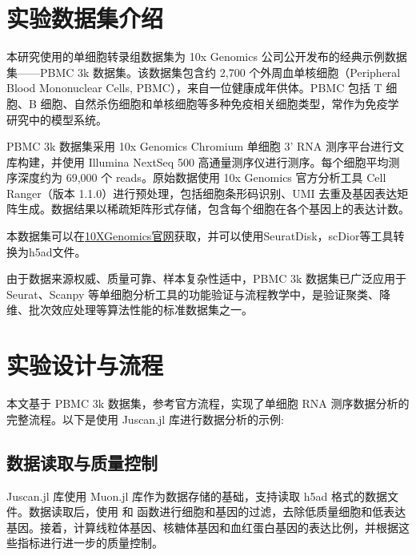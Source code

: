 
\section{实验数据集介绍}

本研究使用的单细胞转录组数据集为 10x Genomics 公司公开发布的经典示例数据集——PBMC 3k 数据集。该数据集包含约 2,700 个外周血单核细胞（Peripheral Blood Mononuclear Cells, PBMC），来自一位健康成年供体。PBMC 包括 T 细胞、B 细胞、自然杀伤细胞和单核细胞等多种免疫相关细胞类型，常作为免疫学研究中的模型系统。

PBMC 3k 数据集采用 10x Genomics Chromium 单细胞 3' RNA 测序平台进行文库构建，并使用 Illumina NextSeq 500 高通量测序仪进行测序。每个细胞平均测序深度约为 69,000 个 reads。原始数据使用 10x Genomics 官方分析工具 Cell Ranger（版本 1.1.0）进行预处理，包括细胞条形码识别、UMI 去重及基因表达矩阵生成。数据结果以稀疏矩阵形式存储，包含每个细胞在各个基因上的表达计数。

本数据集可以在\href{https://cf.10xgenomics.com/samples/cell/pbmc3k/pbmc3k_filtered_gene_bc_matrices.tar.gz}{10XGenomics官网}获取，并可以使用SeuratDisk，scDior等工具转换为h5ad文件。

由于数据来源权威、质量可靠、样本复杂性适中，PBMC 3k 数据集已广泛应用于 Seurat、Scanpy 等单细胞分析工具的功能验证与流程教学中，是验证聚类、降维、批次效应处理等算法性能的标准数据集之一。


\section{实验设计与流程}

本文基于 PBMC 3k 数据集，参考官方流程，实现了单细胞 RNA 测序数据分析的完整流程。以下是使用 Juscan.jl 库进行数据分析的示例:

\subsection{数据读取与质量控制}

Juscan.jl 库使用 Muon.jl 库作为数据存储的基础，支持读取 h5ad 格式的数据文件。数据读取后，使用 和  函数进行细胞和基因的过滤，去除低质量细胞和低表达基因。接着，计算线粒体基因、核糖体基因和血红蛋白基因的表达比例，并根据这些指标进行进一步的质量控制。

